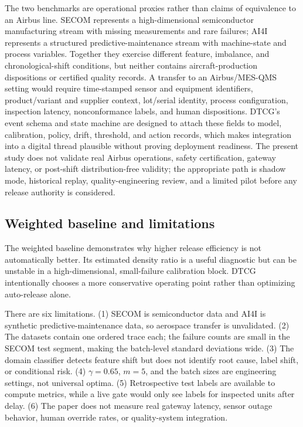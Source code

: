 \documentclass[journal]{IEEEtran}
\begin{document}
The two benchmarks are operational proxies rather than claims of equivalence to an Airbus line. SECOM represents a high-dimensional semiconductor manufacturing stream with missing measurements and rare failures; AI4I represents a structured predictive-maintenance stream with machine-state and process variables. Together they exercise different feature, imbalance, and chronological-shift conditions, but neither contains aircraft-production dispositions or certified quality records. A transfer to an Airbus/MES-QMS setting would require time-stamped sensor and equipment identifiers, product/variant and supplier context, lot/serial identity, process configuration, inspection latency, nonconformance labels, and human dispositions. DTCG's event schema and state machine are designed to attach these fields to model, calibration, policy, drift, threshold, and action records, which makes integration into a digital thread plausible without proving deployment readiness. The present study does not validate real Airbus operations, safety certification, gateway latency, or post-shift distribution-free validity; the appropriate path is shadow mode, historical replay, quality-engineering review, and a limited pilot before any release authority is considered.

\subsection{Weighted baseline and limitations}
The weighted baseline demonstrates why higher release efficiency is not automatically better. Its estimated density ratio is a useful diagnostic but can be unstable in a high-dimensional, small-failure calibration block. DTCG intentionally chooses a more conservative operating point rather than optimizing auto-release alone.

There are six limitations. (1) SECOM is semiconductor data and AI4I is synthetic predictive-maintenance data, so aerospace transfer is unvalidated. (2) The datasets contain one ordered trace each; the failure counts are small in the SECOM test segment, making the batch-level standard deviations wide. (3) The domain classifier detects feature shift but does not identify root cause, label shift, or conditional risk. (4) $\gamma=0.65$, $m=5$, and the batch sizes are engineering settings, not universal optima. (5) Retrospective test labels are available to compute metrics, while a live gate would only see labels for inspected units after delay. (6) The paper does not measure real gateway latency, sensor outage behavior, human override rates, or quality-system integration.
\end{document}
